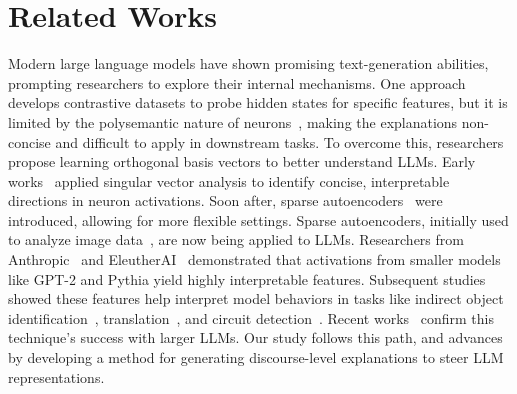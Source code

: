 \section{Related Works}
\vspace{-0.25cm}
Modern large language models have shown promising text-generation abilities, prompting researchers to explore their internal mechanisms. 
One approach~\citep{belinkov2018evaluating,jawahar2019does,rogers2021primer} develops contrastive datasets to probe hidden states for specific features, but it is limited by the polysemantic nature of neurons~\citep{elhage2022toy,olah2020zoom}, making the explanations non-concise and difficult to apply in downstream tasks. To overcome this, researchers~\citep{brickentowards} propose learning orthogonal basis vectors to better understand LLMs. Early works~\citep{Beren2022SVD,wu2024language} applied singular vector analysis to identify concise, interpretable directions in neuron activations. Soon after, sparse autoencoders~\citep{brickentowards,cunningham2023sparse} were introduced, allowing for more flexible settings. 
Sparse autoencoders, initially used to analyze image data~\citep{olshausen1997sparse,makhzani2013k}, are now being applied to LLMs. Researchers from Anthropic~\citep{brickentowards} and EleutherAI~\citep{cunningham2023sparse} demonstrated that activations from smaller models like GPT-2 and Pythia yield highly interpretable features. Subsequent studies showed these features help interpret model behaviors in tasks like indirect object identification~\citep{makelov2024sparse}, translation~\citep{dumas2024llamas}, and circuit detection~\citep{marks2024sparse}. Recent works~\citep{templeton2024scaling,gao2024scaling,lieberum2024gemma} confirm this technique's success with larger LLMs. 
Our study follows this path, and advances by developing a method for generating discourse-level explanations to steer LLM representations.

\vspace{-0.1cm}